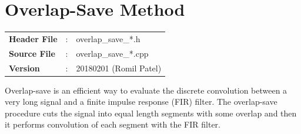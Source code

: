 %
%
\clearpage
\section{Overlap-Save Method}
\begin{tcolorbox}	
	\begin{tabular}{p{2.75cm} p{0.2cm} p{10.5cm}} 	
		\textbf{Header File}   &:&overlap\_save\_*.h \\
		\textbf{Source File}   &:&overlap\_save\_*.cpp \\
		\textbf{Version}       &:& 20180201 (Romil Patel)
	\end{tabular}
\end{tcolorbox}
Overlap-save is an efficient way to evaluate the discrete convolution between a very long signal and a finite impulse response (FIR) filter. The overlap-save procedure cuts the signal into equal length segments with some overlap and then it performs convolution of each segment with the FIR filter.
